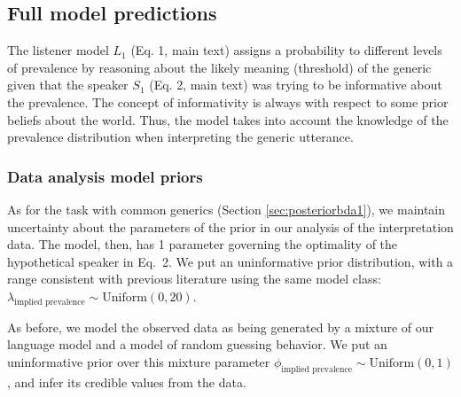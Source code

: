\documentclass[10pt,letterpaper]{article}
\newcommand{\red}[1]{\textcolor{Red}{#1}}
\begin{document}

\subsection{Full model predictions}

The listener model $L_1$ (Eq. 1, main text) assigns a probability to different levels of prevalence by reasoning about the likely meaning (threshold) of the generic given that the speaker $S_1$ (Eq. 2, main text) was trying to be informative about the prevalence. 
The concept of informativity is always with respect to some prior beliefs about the world.
Thus, the model takes into account the knowledge of the prevalence distribution when interpreting the generic utterance. 






\subsubsection{Data analysis model priors}
\label{sec:bdapriors4}

As for the task with common generics (Section \ref{sec:posteriorbda1}), we maintain uncertainty about the parameters of the prior in our analysis of the interpretation data.
The model, then, has 1 parameter governing the optimality of the hypothetical speaker in Eq.~2. 
We put an uninformative prior distribution, with a range consistent with previous literature using the same model class: $\lambda_{\text{implied prevalence}} \sim \text{Uniform}(0, 20)$.

As before, we model the observed data as being generated by a mixture of our language model and a model of random guessing behavior. 
We put an uninformative prior over this mixture parameter $\phi_{\text{implied prevalence}} \sim \text{Uniform}(0,1)$, and infer its credible values from the data.
\end{document}
